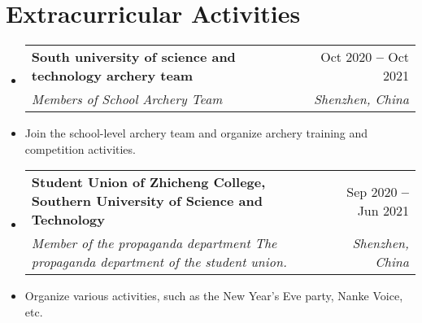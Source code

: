 \documentclass[letterpaper,11pt]{article}
\makeatletter
\newcommand{\resumeItem}[1]{
  \item\small{
    {#1 \vspace{-2pt}}
  }
}
\newcommand{\resumeSubheading}[4]{
  \vspace{-2pt}\item
    \begin{tabular*}{0.97\textwidth}[t]{l@{\extracolsep{\fill}}r}
      \textbf{#1} & #2 \\
      \textit{\small#3} & \textit{\small #4} \\
    \end{tabular*}\vspace{-7pt}
}
\newcommand{\resumeSubHeadingListStart}{\begin{itemize}[leftmargin=0.15in, label={}]}
\newcommand{\resumeSubHeadingListEnd}{\end{itemize}}
\makeatother
\begin{document}
\section{Extracurricular Activities} \vspace{3pt}
\resumeSubHeadingListStart \resumeSubheading {South university of science and technology archery
  team}{Oct 2020 \textbf{--}
  Oct 2021} {Members of School Archery Team}{Shenzhen, China} \resumeItem{Join the school-level
  archery team and organize archery training and competition activities.
}

\resumeSubheading
{Student Union of Zhicheng College, Southern University of Science and Technology}{Sep 2020 \textbf{--}
  Jun 2021} {Member of the propaganda department The propaganda department of the student union.
}{Shenzhen, China}
\resumeItem{Organize various activities, such as the New Year's Eve party, Nanke Voice, etc.}
\resumeSubHeadingListEnd

\end{document}
